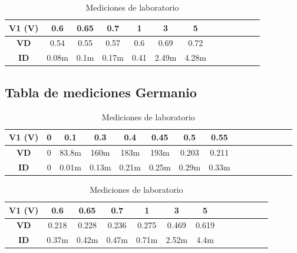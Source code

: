 \begin{table}[H]
\centering
\caption{Mediciones de laboratorio}
\begin{tabular}{|c|c|c|c|c|c|c|c|c|c|c|c|c|}
\hline
\textbf{V1 (V)}  & 0.6 & 0.65 & 0.7 & 1 & 3 & 5\\
\hline
\textbf{VD}  & 0.54 & 0.55 & 0.57 & 0.6 & 0.69 & 0.72\\
\hline
\textbf{ID}  & 0.08m & 0.1m & 0.17m & 0.41 & 2.49m & 4.28m\\
\hline
\end{tabular}
\end{table}


\subsection*{Tabla de mediciones Germanio}

\begin{table}[H]
\centering
\caption{Mediciones de laboratorio}
\begin{tabular}{|c|c|c|c|c|c|c|c|c|c|c|c|c|c|c|}
\hline
\textbf{V1 (V)} & 0 & 0.1 & 0.3 & 0.4 & 0.45 & 0.5 & 0.55\\
\hline
\textbf{VD} & 0 & 83.8m & 160m & 183m & 193m & 0.203 & 0.211\\
\hline
\textbf{ID} & 0 & 0.01m & 0.13m & 0.21m & 0.25m & 0.29m & 0.33m\\
\hline
\end{tabular}
\end{table}

\begin{table}[H]
\centering
\caption{Mediciones de laboratorio}
\begin{tabular}{|c|c|c|c|c|c|c|c|c|c|c|c|c|}
\hline
\textbf{V1 (V)}  & 0.6 & 0.65 & 0.7 & 1 & 3 & 5\\
\hline
\textbf{VD}  & 0.218 & 0.228 & 0.236 & 0.275 & 0.469 & 0.619 \\
\hline
\textbf{ID}  & 0.37m & 0.42m & 0.47m & 0.71m & 2.52m & 4.4m\\
\hline
\end{tabular}
\end{table}



